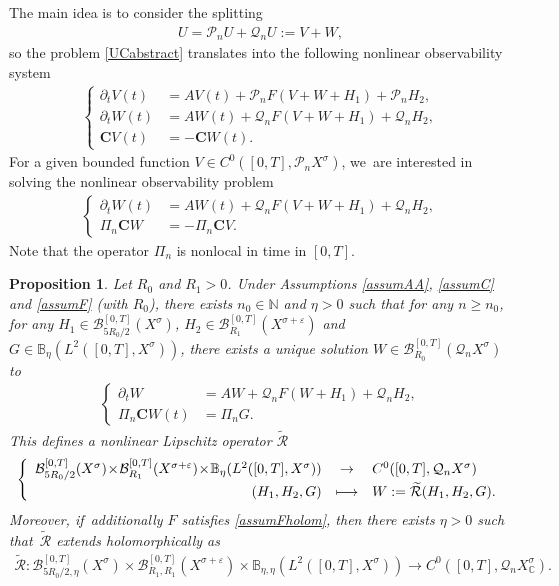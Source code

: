 \documentclass[10pt]{amsart}
\newcommand\mto{\mathchoice{\longmapsto}{\mapsto}{\mapsto}{\mapsto}}
\newtheorem{proposition}[theorem]{Proposition}
\theoremstyle{definition}
\let\mc\mathcal
\let\veps\varepsilon
\newcommand{\B}{\mc{B}}
\newcommand{\N}{\mathbb{N}}
\newcommand{\Q}{\mathcal{Q}}
\renewcommand{\P}{\mathcal{P}}
\newcommand{\bC}{\boldsymbol{C}}
\let\dpl\displaystyle
\begin{document}
The main idea is to consider the splitting
\begin{align*}
U=\P_n U+\Q_n U:=V+W,
\end{align*}
so the problem \eqref{UCabstract} translates into the following nonlinear observability system
\begin{align*}
\left\{\begin{array}{rl}
\partial_t V(t)&=AV(t)+\P_n F( V+W+H_{1})+\P_{n}H_{2}, \\[3pt]
\partial_t W(t)&=AW(t)+\Q_n F(V+W+H_{1})+\Q_{n}H_{2}, \\[3pt]
\bC V(t)&=-\bC W(t).
\end{array}\right.
\end{align*}
For a given bounded function $V\in C^0([0, T], \P_n X^\sigma)$, we~are interested in solving the nonlinear observability problem
\begin{align*}
\left\{\begin{array}{rl}
\partial_t W(t)&=AW(t)+\Q_n F(V+W+H_{1})+\Q_{n}H_{2}, \\[3pt]
\Pi_n\bC W &=- \Pi_n\bC V.
\end{array}\right.
\end{align*}
Note that the operator $\Pi_{n}$ is nonlocal in time in $[0,T]$.
\begin{proposition}\label{propabstract}
Let $R_{0}$ and $R_{1}>0$. Under Assumptions \ref{assumAA}, \ref{assumC} and \ref{assumF} (with $R_{0}$), there exists $n_{0}\in \N$ and $\eta>0$ such that for any $n\geq n_{0}$, for any $H_{1}\in \B_{5R_{0}/2}^{[0,T]}(X^{\sigma})$, $H_{2}\in \B_{R_{1}}^{[0,T]}(X^{\sigma+\veps})$ and $G\in \mathbb{B}_{\eta}(L^2([0, T], X^{\sigma}))$, there exists a unique solution $W\in \B_{R_{0}}^{[0,T]}(\Q_n X^{\sigma})$ to
\begin{align}\label{eqWG}
\left\{\begin{array}{rl}
\partial_t W&=AW+\Q_n F(W+H_{1})+\Q_{n}H_{2}, \\[3pt]
\Pi_n\bC W(t) &=\Pi_nG.
\end{array}\right.
\end{align}
This defines a nonlinear Lipschitz operator $\mathcal{\widetilde{R}}$
\begin{align}
\left\{\begin{array}{rcl}
\B_{5R_{0}/2}^{[0,T]}(X^{\sigma}) \!\times\! \B_{R_{1}}^{[0,T]}(X^{\sigma+\veps}) \!\times\! \mathbb{B}_{\eta}(L^{2}([0,T],X^{\sigma})) & \dpl\to& C^0([0, T], \Q_{n }X^{\sigma})\\[3pt]
(H_{1},H_{2},G)&\dpl\mto& W:=\mathcal{\widetilde{R}}(H_{1},H_{2},G).
\end{array}\right.
\end{align}
Moreover, if~additionally $F$ satisfies \cref{assumFholom}, then there exists $\eta>0$ such that~$\mathcal{\widetilde{R}}$ extends holomorphically as
\begin{align*}
\mathcal{\widetilde{R}}: \B_{5R_{0}/2,\eta}^{[0,T]}(X^{\sigma}) \times \B_{R_{1}, R_{1}}^{[0,T]}(X^{\sigma+\veps})\times \mathbb{B}_{\eta,\eta}(L^{2}([0,T],X^{\sigma})) \to C^0([0, T], \Q_{n }X^{\sigma}_{\mathbb{C}}).
\end{align*}
\end{proposition}
\end{document}
